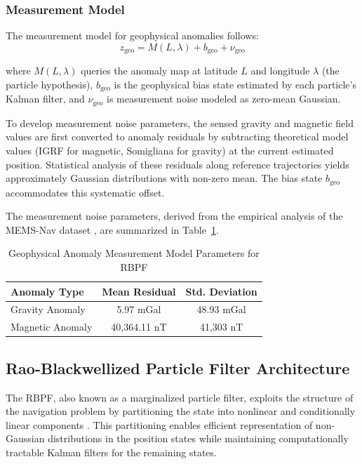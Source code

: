 \documentclass[letterpaper,times]{IONconf}
\begin{document}
\subsubsection{Measurement Model}

The measurement model for geophysical anomalies follows:
\begin{equation}
z_{\text{geo}} = M(L, \lambda) + b_{\text{geo}} + \nu_{\text{geo}}
\end{equation}

where \(M(L, \lambda)\) queries the anomaly map at latitude \(L\) and longitude \(\lambda\) (the particle hypothesis), \(b_{\text{geo}}\) is the geophysical bias state estimated by each particle's Kalman filter, and \(\nu_{\text{geo}}\) is measurement noise modeled as zero-mean Gaussian.

To develop measurement noise parameters, the sensed gravity and magnetic field values are first converted to anomaly residuals by subtracting theoretical model values (IGRF for magnetic, Somigliana for gravity) at the current estimated position. Statistical analysis of these residuals along reference trajectories yields approximately Gaussian distributions with non-zero mean. The bias state \(b_{\text{geo}}\) accommodates this systematic offset.

The measurement noise parameters, derived from the empirical analysis of the MEMS-Nav dataset \citep{brodovsky2026anomaly_ukf}, are summarized in Table~\ref{tab:rbpf_anomaly_measurement_model}.

\begin{table}[h]
    \centering
    \caption{Geophysical Anomaly Measurement Model Parameters for RBPF}
    \begin{tabular}{lcc}
        \hline
        Anomaly Type & Mean Residual & Std. Deviation \\
        \hline
        Gravity Anomaly & 5.97 mGal & 48.93 mGal \\
        Magnetic Anomaly & 40,364.11 nT & 41,303 nT \\
        \hline
    \end{tabular}
    \label{tab:rbpf_anomaly_measurement_model}
\end{table}

\subsection{Rao-Blackwellized Particle Filter Architecture}

The RBPF, also known as a marginalized particle filter, exploits the structure of the navigation problem by partitioning the state into nonlinear and conditionally linear components \citep{canciani2017airborne}. This partitioning enables efficient representation of non-Gaussian distributions in the position states while maintaining computationally tractable Kalman filters for the remaining states.
\end{document}
